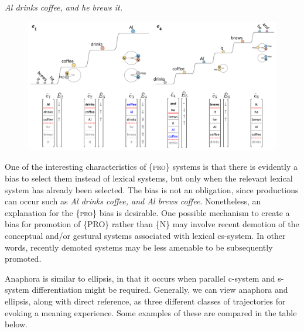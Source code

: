     \textit{Al drinks coffee, and he brews it.}

  
\begin{figure}
\includegraphics[width=\textwidth]{figures/Tilsen-img153.png}
\caption{\missingcaption}
\label{fig:}
\end{figure}
 

  One of the interesting characteristics of \{\textsc{pro}\} systems is that there is evidently a bias to select them instead of lexical systems, but only when the relevant lexical system has already been selected. The bias is not an obligation, since productions can occur such as \textit{Al drinks coffee, and Al brews coffee}. Nonetheless, an explanation for the \{\textsc{pro}\} bias is desirable. One possible mechanism to create a bias for promotion of \{PRO\} rather than \{N\} may involve recent demotion of the conceptual and/or gestural systems associated with lexical cs-system. In other words, recently demoted systems may be less amenable to be subsequently promoted.

  Anaphora is similar to ellipsis, in that it occurs when parallel c-system and s-system differentiation might be required. Generally, we can view anaphora and ellipsis, along with direct reference, as three different classes of trajectories for evoking a meaning experience. Some examples of these are compared in the table below. 

